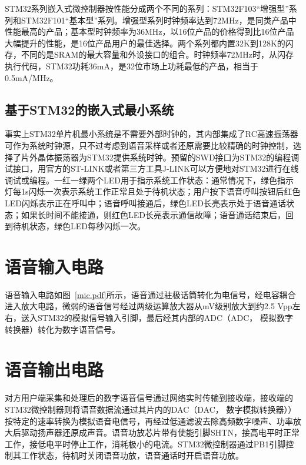 STM32{\cf}系列{\cf}嵌入{\cf}式微{\cf}控制{\cf}器按{\cf}性能{\cf}分成{\cf}两个{\cf}不同{\cf}的系{\cf}列：{\cf}ST{\cf}M3{\cf}2F{\cf}10{\cf}3“{\cf}增强{\cf}型”{\cf}系列{\cf}和S{\cf}TM{\cf}32{\cf}F1{\cf}01{\cf}“基{\cf}本型{\cf}”系{\cf}列。{\cf}增强{\cf}型系{\cf}列时{\cf}钟频{\cf}率达{\cf}到7{\cf}2M{\cf}Hz{\cf}，是{\cf}同类{\cf}产品{\cf}中性{\cf}能最{\cf}高的{\cf}产品{\cf}；基{\cf}本型{\cf}时钟{\cf}频率{\cf}为3{\cf}6M{\cf}Hz{\cf}，以{\cf}16{\cf}位产{\cf}品的{\cf}价格{\cf}得到{\cf}比1{\cf}6位{\cf}产品{\cf}大幅{\cf}提升{\cf}的性{\cf}能，{\cf}是1{\cf}6位{\cf}产品{\cf}用户{\cf}的最{\cf}佳选{\cf}择。{\cf}两个{\cf}系列{\cf}都内{\cf}置3{\cf}2K{\cf}到1{\cf}28{\cf}K的{\cf}闪存{\cf}，不{\cf}同的{\cf}是S{\cf}RA{\cf}M的{\cf}最大{\cf}容量{\cf}和外{\cf}设接{\cf}口的{\cf}组合{\cf}。时{\cf}钟频{\cf}率7{\cf}2M{\cf}Hz{\cf}时，{\cf}从闪{\cf}存执{\cf}行代{\cf}码，{\cf}ST{\cf}M3{\cf}2功{\cf}耗3{\cf}6m{\cf}A，{\cf}是3{\cf}2位{\cf}市场{\cf}上功{\cf}耗最{\cf}低的{\cf}产品{\cf}，相{\cf}当于{\cf}0.5mA/MHz。

\subsection{基于STM32的嵌入式最小系统}
事实上STM32单片机最小系统是不需要外部时钟的，其内部集成了RC高速振荡器可作为系统时钟源，只不过考虑到语音采样或者还原需要比较精确的时钟控制，选择了片外晶体振荡器为STM32提供系统时钟。预留的SWD接口为STM32的编程调试接口，用官方的ST-LINK或者第三方工具J-LINK可以方便地对STM32进行在线调试或编程。一红一绿两个LED用于指示系统工作状态：通常情况下，绿色指示灯每1s闪烁一次表示系统工作正常且处于待机状态；用户按下语音呼叫按钮后红色LED闪烁表示正在呼叫中；语音呼叫接通后，绿色LED长亮表示处于语音通话状态；如果长时间不能接通，则红色LED长亮表示通信故障；语音通话结束后，回到待机状态，绿色LED每秒闪烁一次。

\section{语音输入电路}
语音输入电路如图~\ref{mic.pdf}所示，语音通过驻极话筒转化为电信号，经电容耦合进入放大电路，微弱的语音信号经过两级运算放大器从mV级别放大到约2.5 Vpp左右，送入STM32的模拟信号输入引脚，最后经其内部的ADC（\acrlong{ADC}， 模拟数字转换器）转化为数字语音信号。

\section{语音输出电路}
对方用户端采集和处理后的数字语音信号通过网络实时传输到接收端，接收端的STM32微控制器则将语音数据流通过其片内的DAC（\acrlong{DAC}， 数字模拟转换器））按特定的速率转换为模拟语音电信号，再经过低通滤波去除高频数字噪声、功率放大后驱动扬声器还原成声音。语音功放芯片带有使能引脚SHTN，接高电平时正常工作，接低电平时停止工作，消耗极小的电流。STM32微控制器通过PB1引脚控制其工作状态，待机时关闭语音功放，语音通话时开启语音功放。


